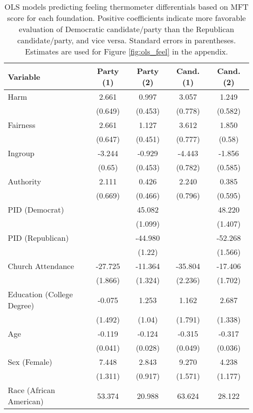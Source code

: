 \begin{table}[h]
\centering
\caption{OLS models predicting feeling thermometer differentials based on
           MFT score for each foundation. Positive coefficients indicate more favorable evaluation 
           of Democratic candidate/party than the Republican candidate/party, and vice versa. 
           Standard errors in parentheses. Estimates are used for Figure \ref{fig:ols_feel} 
           in the appendix.} 
\label{tab:ols_feel}
\begingroup\footnotesize
\begin{tabular}{lcccc}
  \hline
Variable & Party (1) & Party (2) & Cand. (1) & Cand. (2) \\ 
  \hline
Harm &   2.661 &   0.997 &   3.057 &   1.249 \\ 
   & (0.649) & (0.453) & (0.778) & (0.582) \\ 
  Fairness &   2.661 &   1.127 &   3.612 &   1.850 \\ 
   & (0.647) & (0.451) & (0.777) & (0.58) \\ 
  Ingroup &  -3.244 &  -0.929 &  -4.443 &  -1.856 \\ 
   & (0.65) & (0.453) & (0.782) & (0.585) \\ 
  Authority &   2.111 &   0.426 &   2.240 &   0.385 \\ 
   & (0.669) & (0.466) & (0.796) & (0.595) \\ 
  PID (Democrat) &  &  45.082 &  &  48.220 \\ 
   &  & (1.099) &  & (1.407) \\ 
  PID (Republican) &  & -44.980 &  & -52.268 \\ 
   &  & (1.22) &  & (1.566) \\ 
  Church Attendance & -27.725 & -11.364 & -35.804 & -17.406 \\ 
   & (1.866) & (1.324) & (2.236) & (1.702) \\ 
  Education (College Degree) &  -0.075 &   1.253 &   1.162 &   2.687 \\ 
   & (1.492) & (1.04) & (1.791) & (1.338) \\ 
  Age &  -0.119 &  -0.124 &  -0.315 &  -0.317 \\ 
   & (0.041) & (0.028) & (0.049) & (0.036) \\ 
  Sex (Female) &   7.448 &   2.843 &   9.270 &   4.238 \\ 
   & (1.311) & (0.917) & (1.571) & (1.177) \\ 
  Race (African American) &  53.374 &  20.988 &  63.624 &  28.122 \\ 

\end{tabular}
\end{table}
